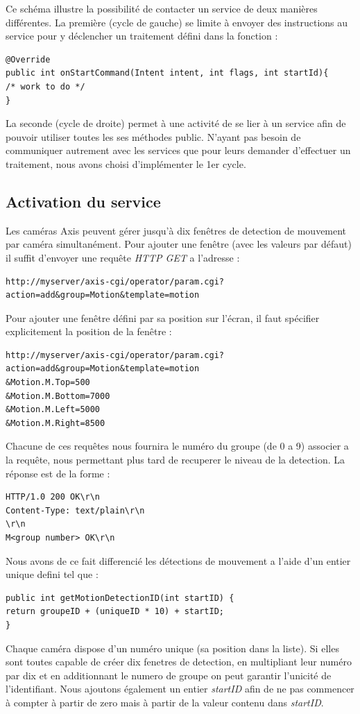 Ce schéma illustre la possibilité de contacter un service de deux manières
différentes. La première (cycle de gauche) se limite à envoyer des instructions 
au service pour y déclencher un traitement défini dans la fonction :
\begin{lstlisting}
@Override
public int onStartCommand(Intent intent, int flags, int startId){
/* work to do */
}
\end{lstlisting}
La seconde (cycle de droite) permet à une activité de se lier à
un service afin de pouvoir utiliser toutes les ses méthodes public.\newline
N'ayant pas besoin de communiquer autrement avec les services que pour leurs
demander d'effectuer un traitement, nous avons choisi d'implémenter le 1er cycle.

\subsection{Activation du service}
Les caméras Axis peuvent gérer jusqu'à dix fenêtres de detection de mouvement par
caméra simultanément. Pour ajouter une fenêtre (avec les valeurs par défaut) il
suffit d'envoyer une requête \textit{HTTP GET} a l'adresse : 
\begin{lstlisting}
http://myserver/axis-cgi/operator/param.cgi?action=add&group=Motion&template=motion
\end{lstlisting}
Pour ajouter une fenêtre défini par sa position sur l'écran, il faut spécifier
explicitement la position de la fenêtre :
\begin{lstlisting}
http://myserver/axis-cgi/operator/param.cgi?action=add&group=Motion&template=motion
&Motion.M.Top=500
&Motion.M.Bottom=7000
&Motion.M.Left=5000
&Motion.M.Right=8500
\end{lstlisting}
Chacune de ces requêtes nous fournira le numéro du groupe (de 0 a 9) associer a
la requête, nous permettant plus tard de recuperer le niveau de la detection.
La réponse est de la forme : 
\begin{lstlisting}
HTTP/1.0 200 OK\r\n
Content-Type: text/plain\r\n
\r\n
M<group number> OK\r\n
\end{lstlisting}
Nous avons de ce fait differencié les détections de mouvement a l'aide d'un entier unique defini tel que : 
\begin{lstlisting}
public int getMotionDetectionID(int startID) {
return groupeID + (uniqueID * 10) + startID;
}
\end{lstlisting}
Chaque caméra dispose d'un numéro unique (sa position dans la liste).
Si elles sont toutes capable de créer dix fenetres de detection, 
en multipliant leur numéro par dix et en additionnant le numero de groupe on peut garantir l'unicité de l'identifiant. Nous ajoutons également un entier \textit{startID} afin de ne pas commencer à compter à partir de zero mais à partir de la valeur contenu dans \textit{startID}.\newline

